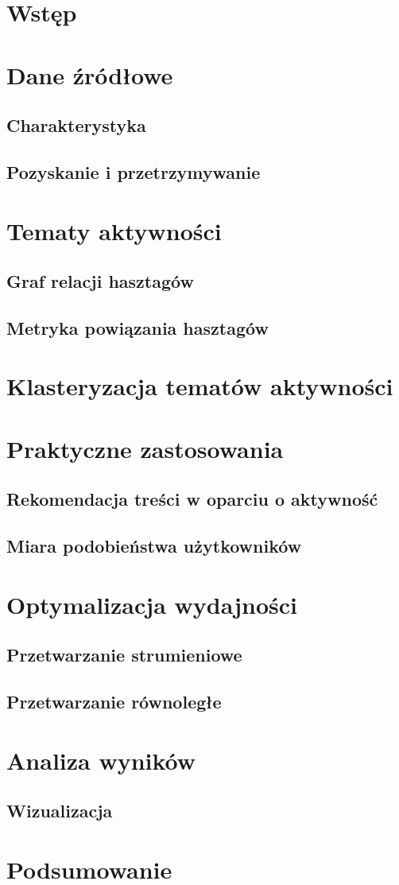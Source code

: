 \chapter{Wstęp}
\label{cha:wstep}

\chapter{Dane źródłowe}
\section{Charakterystyka}
\section{Pozyskanie i przetrzymywanie}

\chapter{Tematy aktywności}
\section{Graf relacji hasztagów}
\section{Metryka powiązania hasztagów}

\chapter{Klasteryzacja tematów aktywności}

\chapter{Praktyczne zastosowania}
\section{Rekomendacja treści w oparciu o aktywność}
\section{Miara podobieństwa użytkowników}

\chapter{Optymalizacja wydajności}
\section{Przetwarzanie strumieniowe}
\section{Przetwarzanie równoległe}

\chapter{Analiza wyników}
\section{Wizualizacja}

\chapter{Podsumowanie}
